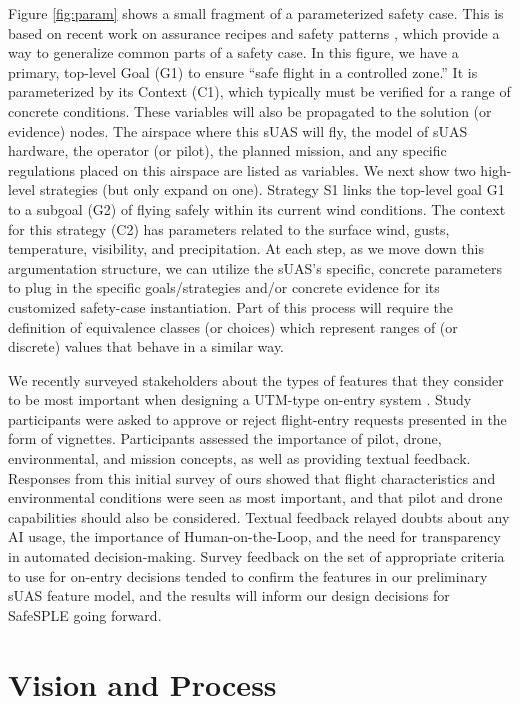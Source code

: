 Figure \ref{fig:param} shows a small fragment of a parameterized safety case. This is based on recent work on assurance recipes \cite{FirestoneC18} and safety patterns \cite{depai2016}, which provide a way to generalize common parts of a safety case. In this figure, we have a primary, top-level Goal (G1) to ensure ``safe flight in a controlled zone.'' It is parameterized by its Context (C1), which typically must be verified for a range of concrete conditions. These variables will also be propagated to the solution (or evidence) nodes. The airspace where this sUAS will fly, the model of sUAS hardware, the operator (or pilot), the planned mission, and any specific regulations placed on this airspace are listed as variables. We next show two high-level strategies (but only expand on one). Strategy S1 links the top-level goal G1 to a subgoal (G2) of flying safely within its current wind conditions. The context for this strategy (C2) has parameters related to the surface wind, gusts, temperature, visibility, and precipitation. At each step, as we move down this argumentation structure, we can utilize the sUAS's specific, concrete parameters to plug in the specific goals/strategies and/or concrete evidence for its customized safety-case instantiation. Part of this process will require the definition of equivalence classes (or choices) which represent ranges of (or discrete) values that behave in a similar way.
 
We recently surveyed stakeholders about the types of features that they consider to be most important when designing a UTM-type on-entry system \cite{gohar2024towards}. Study participants were asked to approve or reject flight-entry requests presented in the form of vignettes. Participants assessed the importance of pilot, drone, environmental, and mission concepts, as well as providing textual feedback. Responses from this initial survey of ours showed that flight characteristics and environmental conditions were seen as most important, and that pilot and drone capabilities should also be considered. Textual feedback relayed doubts about any AI usage, the importance of Human-on-the-Loop, and the need for transparency in automated decision-making. Survey feedback on the set of appropriate criteria to use for on-entry decisions tended to confirm the features in our preliminary sUAS feature model, and the results will inform our design decisions for SafeSPLE going forward. 

 
\section{Vision and Process}

